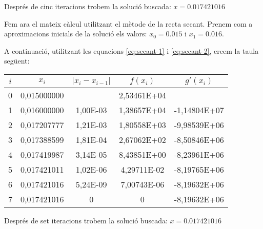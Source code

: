 \begin{exemple}
Després de cinc iteracions trobem la solució buscada: $x=\num{0,017421016}$

Fem ara el mateix càlcul utilitzant el mètode de la recta secant. Prenem com a  aproximacions inicials de la solució els valors: $x_0 = \num{0,015}$ i $x_1 = \num{0,016}$.

 A continuació, utilitzant les equacions \eqref{eq:secant-1} i \eqref{eq:secant-2}, creem la taula següent:

\begin{center}
   \centering
   \begin{tabular}{S[table-format=1.0]S[table-format=2.9]S[table-format=2.2e+2]
   S[table-format=2.5e+2]S[table-format=+3.5e+2]}
    & {$x_i$}  & {$|x_i - x_{i-1}|$} & {$f(x_i)$} & {$g'(x_i)$} \\
   	&  0,015000000 & {}       & 2,53461E+04 & {}             \\
       1	&  0,016000000 & 1,00E-03 & 1,38657E+04 & -1,14804E+07 \\
       2	&  0,017207777 & 1,21E-03 & 1,80558E+03 & -9,98539E+06 \\
       3	&  0,017388599 & 1,81E-04 & 2,67062E+02 & -8,50846E+06 \\
       4	&  0,017419987 & 3,14E-05 & 8,43851E+00 & -8,23961E+06 \\
       5	&  0,017421011 & 1,02E-06 & 4,29711E-02 & -8,19765E+06 \\
       6	&  0,017421016 & 5,24E-09 & 7,00743E-06 & -8,19632E+06 \\
       7	&  0,017421016 & 0        & 0           & -8,19632E+06 \\
   \bottomrule[1pt]
   \end{tabular}
\end{center}


Després de set iteracions trobem la solució buscada: $x=\num{0,017421016}$


\end{exemple} 